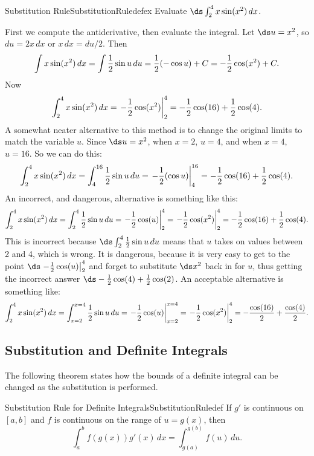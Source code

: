 \begin{example}{Substitution Rule}{SubstitutionRuledefex}
Evaluate $\ds\int_2^4 x\sin(x^2)\,dx$. 
\end{example}

\begin{solution} 
First we compute the
antiderivative, then evaluate the integral.
Let $\ds u=x^2$, so $du=2x\,dx$ or $x\,dx=du/2$. Then
$$
  \int x\sin(x^2)\,dx=\int {1\over 2} \sin u\,du={1\over 2}(-\cos u)+C=
  -{1\over 2}\cos(x^2)+C.
$$
Now
$$
  \int_2^4 x\sin(x^2)\,dx=\left.-{1\over 2}\cos(x^2)\right|_2^4
  =-{1\over 2}\cos(16)+{1\over 2}\cos(4).
$$
A somewhat neater alternative to this method is to change the original
limits to match the variable $u$. Since $\ds u=x^2$, when $x=2$, $u=4$,
and when $x=4$, $u=16$. So we can do this:
$$
  \int_2^4 x\sin(x^2)\,dx=
  \int_4^{16} {1\over 2} \sin u\,du=\left.-{1\over 2}(\cos u)\right|_4^{16}
  =-{1\over 2}\cos(16)+{1\over 2}\cos(4).
$$
An incorrect, and dangerous, alternative is something like this:
$$
  \int_2^4 x\sin(x^2)\,dx=\int_2^4 {1\over 2} \sin u\,du=
  \left.-{1\over 2}\cos (u)\right|_2^4=
  \left.-{1\over 2}\cos(x^2)\right|_2^4=-{1\over 2}\cos(16)+{1\over
  2}\cos(4).
$$
This is incorrect because $\ds\int_2^4 {1\over 2} \sin u\,du$
means that $u$ takes on values between 2 and 4, which is wrong. It
is dangerous, because it is very easy to get to 
the point $\ds\left.-{1\over 2}\cos (u)\right|_2^4$ and forget to substitute
$\ds x^2$ back in for $u$, thus getting the incorrect answer
$\ds -{1\over 2}\cos(4)+{1\over 2}\cos(2)$. An acceptable alternative is something like:
$$ 
  \int_2^4 x\sin(x^2)\,dx=\int_{x=2}^{x=4} {1\over 2} \sin u\,du=
  \left.-{1\over 2}\cos (u)\right|_{x=2}^{x=4}=
  \left.-{1\over 2}\cos(x^2)\right|_2^4=-{\cos(16)\over 2}+{\cos(4)\over2}.
$$
\end{solution}

\subsection{Substitution and Definite Integrals}

The following theorem states how the bounds of a definite integral can be changed as the substitution is performed.

\begin{theorem}{Substitution Rule for Definite Integrals}{SubstitutionRuledef}
If $g'$ is continuous on $[a,b]$ and $f$ is continuous on the range of $u=g(x)$, then
$$\int_a^b f(g(x))g'(x)\,dx=\int_{g(a)}^{g(b)}f(u)\,du.$$
\end{theorem}



